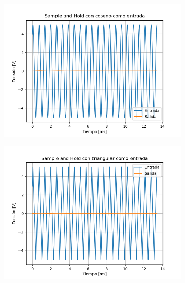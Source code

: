 \begin{figure}[H]
	\begin{subfigure}{.5\textwidth}
	\centering
	\includegraphics[width=\textwidth]{ImagenesEjercicio6/puntob2/SH - Cos.png}
	\end{subfigure}
	\begin{subfigure}{.5\textwidth}
	\centering
	\includegraphics[width=\textwidth]{ImagenesEjercicio6/puntob2/SH - Tri.png}
	\end{subfigure}
\end{figure}

